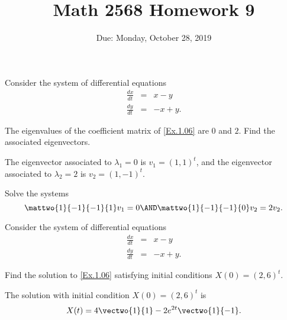 \documentclass{article}
\title{Math 2568 Homework 9}
\author{\phantom{Dr. Golubitsky}}
\date{Due: Monday, October 28, 2019}
\begin{document}
\maketitle


\problemlabel

\noindent Consider the system of differential equations \begin{equation} \label{Ex.1.06} \begin{array}{rcr} \frac{dx}{dt}  & = & x-y \\ \frac{dy}{dt}  & = & -x+y. \end{array} \end{equation}

\begin{exercise} \label{c6.1.06a}
The eigenvalues of the coefficient matrix of \eqref{Ex.1.06} are $0$ and $2$.
Find the associated eigenvectors.

\begin{solution}

\ans The eigenvector associated to $\lambda_1 = 0$ is $v_1 = (1,1)^t$,
and the eigenvector associated to $\lambda_2 = 2$ is $v_2 = (1,-1)^t$.

\soln Solve the systems
\[
\mattwo{1}{-1}{-1}{1}v_1 = 0 \AND \mattwo{1}{-1}{-1}{0}v_2 = 2v_2.
\]

\end{solution}
\end{exercise}





\problemlabel

\noindent Consider the system of differential equations \begin{equation} \label{Ex.1.06} \begin{array}{rcr} \frac{dx}{dt}  & = & x-y \\ \frac{dy}{dt}  & = & -x+y. \end{array} \end{equation}

\begin{exercise} \label{c6.1.06c}
Find the solution to \eqref{Ex.1.06} satisfying initial conditions
$X(0)=(2,6)^t$.

\begin{solution}
The solution with initial condition $X(0) = (2,6)^t$ is 
\[
X(t) = 4\vectwo{1}{1} - 2e^{2t}\vectwo{1}{-1}.
\]


\end{solution}
\end{exercise}
\end{document}
